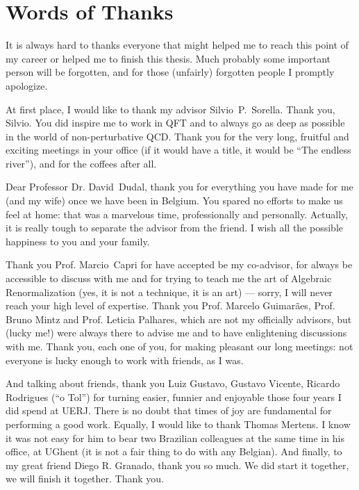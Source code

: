 \thispagestyle{empty}

\chapter*{Words of Thanks}


It is always hard to thanks everyone that might helped me to reach this point of my career or
helped me to finish this thesis. Much probably some important person will be forgotten,
and for those (unfairly) forgotten people I promptly apologize.

At first place, I would like to thank my advisor Silvio~P.~Sorella. Thank you, Silvio. You did
inspire me to work in QFT and to always go as deep as possible in the world of non-perturbative
QCD. Thank you for the very long, fruitful and exciting meetings in your office (if it would
have a title, it would be ``The endless river''), and for the coffees after all. 

Dear Professor Dr. David~Dudal, thank you for everything you have made for me (and my wife) once
we have been in Belgium. You spared no efforts to make us feel at home: that was a marvelous
time, professionally and personally. Actually, it is really tough to separate the advisor
from the friend. I wish all the possible happiness to you and your family.

Thank you Prof. Marcio~Capri for have accepted be my co-advisor, for always be
accessible to discuss with me and for trying to teach me the art of Algebraic
Renormalization (yes, it is not a technique, it is an art) --- sorry, I will never reach your
high level of expertise. Thank you Prof. Marcelo Guimar\~aes, Prof. Bruno Mintz and Prof.
Leticia Palhares, which are not my officially advisors, but (lucky me!) were always there to
advise me and to have enlightening discussions with me. Thank you, each one of you, for making
pleasant our long meetings: not everyone is lucky enough to work with friends, as I was.

And talking about friends, thank you Luiz Gustavo, Gustavo Vicente, Ricardo Rodrigues (``o
Tol'') for turning easier, funnier and enjoyable those four years I did spend at UERJ. There
is no doubt that times of joy are fundamental for performing a good work. Equally, I would like
to thank Thomas Mertens. I know it was not easy for him to bear two Brazilian colleagues at
the same time in his office, at UGhent (it is not a fair thing to do with any Belgian). And
finally, to my great friend Diego R. Granado, thank you so much. We did start it together, we
will finish it together. Thank you.

